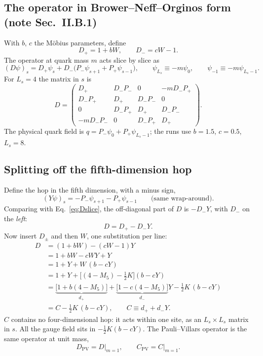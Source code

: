 \documentclass[11pt,a4paper]{article}
\numberwithin{equation}{section}
\newcommand{\Dpv}{D_{\mathrm{PV}}}
\newcommand{\Cpv}{C_{\mathrm{PV}}}
\newcommand{\Pp}{P_{+}}
\newcommand{\Pm}{P_{-}}
\begin{document}
\subsection{The operator in Brower--Neff--Orginos form (note Sec.~II.B.1)}
\label{sec:bno}
With $b$, $c$ the M\"obius parameters, define
\begin{equation}
D_+=1+bW,\qquad D_-=cW-1 .
\end{equation}
The operator at quark mass $m$ acts slice by slice as
\begin{equation}
(D\psi)_s=D_+\psi_s+D_-\big(\Pm\psi_{s+1}+\Pp\psi_{s-1}\big),
\qquad \psi_{L_s}\equiv-m\psi_0,\qquad \psi_{-1}\equiv-m\psi_{L_s-1}.
\label{eq:Dslice}
\end{equation}
For $L_s=4$ the matrix in $s$ is
\begin{equation}
D=\begin{pmatrix}
D_+ & D_-\Pm & 0 & -mD_-\Pp\\
D_-\Pp & D_+ & D_-\Pm & 0\\
0 & D_-\Pp & D_+ & D_-\Pm\\
-mD_-\Pm & 0 & D_-\Pp & D_+
\end{pmatrix}.
\end{equation}
The physical quark field is $q=\Pm\psi_0+\Pp\psi_{L_s-1}$; the runs use $b=1.5$, $c=0.5$,
$L_s=8$.

\subsection{Splitting off the fifth-dimension hop}
\label{sec:split}
Define the hop in the fifth dimension, with a minus sign,
\begin{equation}
(Y\psi)_s=-\Pm\psi_{s+1}-\Pp\psi_{s-1}\qquad\text{(same wrap-around)}.
\end{equation}
Comparing with Eq.~\eqref{eq:Dslice}, the off-diagonal part of $D$ is $-D_-Y$, with $D_-$ on the
\emph{left}:
\begin{equation}
D=D_+-D_-Y .
\end{equation}
Now insert $D_\pm$ and then $W$, one substitution per line:
\begin{align}
D&=(1+bW)-(cW-1)Y\nonumber\\
&=1+bW-cWY+Y\nonumber\\
&=1+Y+W\,(b-cY)\nonumber\\
&=1+Y+\Big[(4-M_5)-\tfrac12K\Big](b-cY)\nonumber\\
&=\underbrace{\big[1+b(4-M_5)\big]}_{d_+}+\underbrace{\big[1-c(4-M_5)\big]}_{d_-}Y
-\tfrac12K\,(b-cY)\nonumber\\
&=C-\tfrac12K\,(b-cY),\qquad C\equiv d_++d_-Y .
\label{eq:Dsplit}
\end{align}
$C$ contains no four-dimensional hop: it acts within one site, as an $L_s\times L_s$ matrix in
$s$. All the gauge field sits in $-\frac12K(b-cY)$. The Pauli--Villars operator is the same
operator at unit mass,
\begin{equation}
\Dpv=D\big|_{m=1},\qquad \Cpv=C\big|_{m=1}.
\end{equation}
\end{document}
